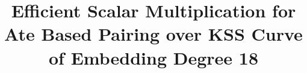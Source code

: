 




% 






\title{Efficient Scalar Multiplication for Ate Based Pairing over KSS Curve of Embedding Degree 18}


